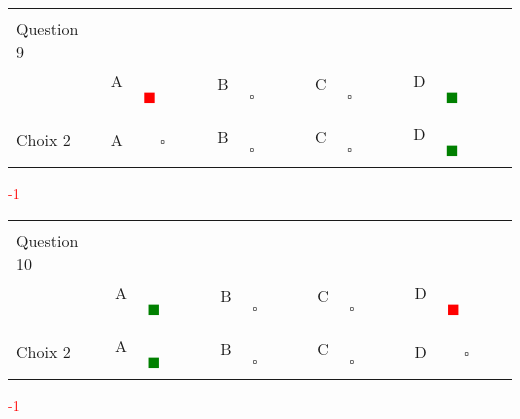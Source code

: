 \documentclass{book}%
\begin{document}
\thispagestyle{empty}%
\begin{center}%
\begin{tabular}{| l  l  l  l  l |}%
\hline%
 & & & & \\%
Question 9\qquad \qquad\ & & & & \\%
& A \textcolor{red}{$\qquad \blacksquare \qquad$}& B $\qquad \square \qquad$& C $\qquad \square \qquad$& D \textcolor{green}{$\qquad \blacksquare \qquad$}\\%
 & & & & \\%
\hline%
 & & & &  \\%
Choix 2& A $\qquad \square \qquad$& B $\qquad \square \qquad$& C $\qquad \square \qquad$& D \textcolor{green}{$\qquad \blacksquare \qquad$}\\%
 & & & &  \\%
\hline%
\end{tabular}%
 \qquad  \textcolor{red}{-1}%
\\ \vskip3mm%
\end{center}%
\thispagestyle{empty}%
\begin{center}%
\begin{tabular}{| l  l  l  l  l |}%
\hline%
 & & & & \\%
Question 10\qquad \qquad\ & & & & \\%
& A \textcolor{green}{$\qquad \blacksquare \qquad$}& B $\qquad \square \qquad$& C $\qquad \square \qquad$& D \textcolor{red}{$\qquad \blacksquare \qquad$}\\%
 & & & & \\%
\hline%
 & & & &  \\%
Choix 2& A \textcolor{green}{$\qquad \blacksquare \qquad$}& B $\qquad \square \qquad$& C $\qquad \square \qquad$& D $\qquad \square \qquad$\\%
 & & & &  \\%
\hline%
\end{tabular}%
 \qquad  \textcolor{red}{-1}%
\\ \vskip3mm%
\end{center}%
\end{document}
